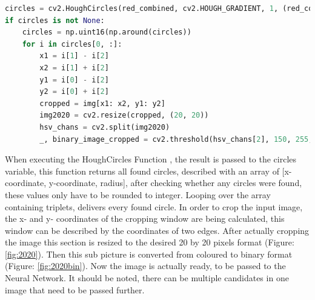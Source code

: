 \begin{lstlisting}[language=python]
circles = cv2.HoughCircles(red_combined, cv2.HOUGH_GRADIENT, 1, (red_combined.shape[0]) / 2, param1=100, param2=20, minRadius=10, maxRadius=0)
if circles is not None:
	circles = np.uint16(np.around(circles))
	for i in circles[0, :]:
		x1 = i[1] - i[2]
		x2 = i[1] + i[2]
		y1 = i[0] - i[2]
		y2 = i[0] + i[2]
		cropped = img[x1: x2, y1: y2]
		img2020 = cv2.resize(cropped, (20, 20))
		hsv_chans = cv2.split(img2020)
		_, binary_image_cropped = cv2.threshold(hsv_chans[2], 150, 255, cv2.THRESH_BINARY)
\end{lstlisting}


When executing the HoughCircles Function \cite{houghcircles}, the result is passed to the circles variable, this function returns all found circles, described with an array of [x-coordinate, y-coordinate, radius],  after checking whether any circles were found, these values only have to be rounded to integer. Looping  over the array containing triplets, delivers every found circle. \newline
In order to crop the input image, the x- and y- coordinates of the cropping window are being calculated, this window can be described by the coordinates of two edges. After actually cropping the image this section is resized to the desired 20 by 20 pixels format (Figure: \ref{fig:2020}). Then this sub picture is converted from coloured to binary format (Figure: \ref{fig:2020bin}). Now the image is actually ready, to be passed to the Neural Network. It should be noted, there can be multiple candidates in one image that need to be passed further.   

